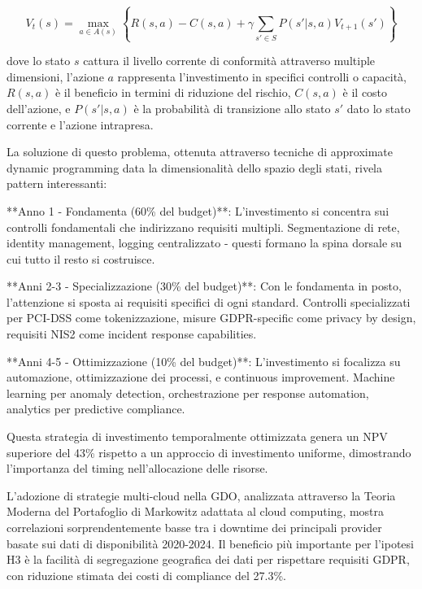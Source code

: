 \begin{equation}
V_t(s) = \max_{a \in A(s)} \left\{ R(s,a) - C(s,a) + \gamma \sum_{s' \in S} P(s'|s,a) V_{t+1}(s') \right\}
\label{eq:bellman_compliance}
\end{equation}

dove lo stato $s$ cattura il livello corrente di conformità attraverso multiple dimensioni, l'azione $a$ rappresenta l'investimento in specifici controlli o capacità, $R(s,a)$ è il beneficio in termini di riduzione del rischio, $C(s,a)$ è il costo dell'azione, e $P(s'|s,a)$ è la probabilità di transizione allo stato $s'$ dato lo stato corrente e l'azione intrapresa.

La soluzione di questo problema, ottenuta attraverso tecniche di approximate dynamic programming data la dimensionalità dello spazio degli stati\autocite{Boyd2004}, rivela pattern interessanti:

**Anno 1 - Fondamenta (60\% del budget)**: L'investimento si concentra sui controlli fondamentali che indirizzano requisiti multipli. Segmentazione di rete, identity management, logging centralizzato - questi formano la spina dorsale su cui tutto il resto si costruisce.

**Anni 2-3 - Specializzazione (30\% del budget)**: Con le fondamenta in posto, l'attenzione si sposta ai requisiti specifici di ogni standard. Controlli specializzati per PCI-DSS come tokenizzazione, misure GDPR-specific come privacy by design, requisiti NIS2 come incident response capabilities.

**Anni 4-5 - Ottimizzazione (10\% del budget)**: L'investimento si focalizza su automazione, ottimizzazione dei processi, e continuous improvement. Machine learning per anomaly detection, orchestrazione per response automation, analytics per predictive compliance.

Questa strategia di investimento temporalmente ottimizzata genera un NPV superiore del 43\% rispetto a un approccio di investimento uniforme, dimostrando l'importanza del timing nell'allocazione delle risorse.

L'adozione di strategie multi-cloud nella GDO, analizzata attraverso la Teoria Moderna del Portafoglio di Markowitz adattata al cloud computing\autocite{tang2024portfolio}, mostra correlazioni sorprendentemente basse tra i downtime dei principali provider basate sui dati di disponibilità 2020-2024\autocite{uptime2024}. Il beneficio più importante per l'ipotesi H3 è la facilità di segregazione geografica dei dati per rispettare requisiti GDPR, con riduzione stimata dei costi di compliance del 27.3\%\autocite{isaca2024compliance}.

